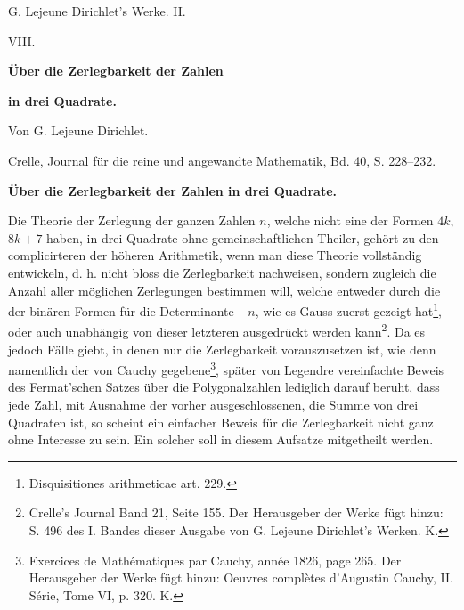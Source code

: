 \documentclass[11pt]{article}
\begin{document}
\begin{center}
{\Large G. Lejeune Dirichlet's Werke. II.}\par\vspace{1.2em}
{\Large VIII.}\par\vspace{0.5em}
{\LARGE \textbf{Über die Zerlegbarkeit der Zahlen}}\par
{\LARGE \textbf{in drei Quadrate.}}\par\vspace{1em}
{\large Von G. Lejeune Dirichlet.}\par\vspace{0.5em}
{\small Crelle, Journal für die reine und angewandte Mathematik, Bd. 40, S. 228--232.}
\end{center}

\begin{center}
{\large \textbf{Über die Zerlegbarkeit der Zahlen in drei Quadrate.}}
\end{center}

Die Theorie der Zerlegung der ganzen Zahlen $n$, welche nicht eine der Formen $4k$, $8k+7$ haben, in drei Quadrate ohne gemeinschaftlichen Theiler, gehört zu den complicirteren der höheren Arithmetik, wenn man diese Theorie vollständig entwickeln, d. h. nicht bloss die Zerlegbarkeit nachweisen, sondern zugleich die Anzahl aller möglichen Zerlegungen bestimmen will, welche entweder durch die der binären Formen für die Determinante $-n$, wie es Gauss zuerst gezeigt hat\footnote{Disquisitiones arithmeticae art. 229.}, oder auch unabhängig von dieser letzteren ausgedrückt werden kann\footnote{Crelle's Journal Band 21, Seite 155. Der Herausgeber der Werke fügt hinzu: S. 496 des I. Bandes dieser Ausgabe von G. Lejeune Dirichlet's Werken. K.}. Da es jedoch Fälle giebt, in denen nur die Zerlegbarkeit vorauszusetzen ist, wie denn namentlich der von Cauchy gegebene\footnote{Exercices de Mathématiques par Cauchy, année 1826, page 265. Der Herausgeber der Werke fügt hinzu: Oeuvres complètes d'Augustin Cauchy, II. Série, Tome VI, p. 320. K.}, später von Legendre vereinfachte Beweis des Fermat'schen Satzes über die Polygonalzahlen lediglich darauf beruht, dass jede Zahl, mit Ausnahme der vorher ausgeschlossenen, die Summe von drei Quadraten ist, so scheint ein einfacher Beweis für die Zerlegbarkeit nicht ganz ohne Interesse zu sein. Ein solcher soll in diesem Aufsatze mitgetheilt werden.
\end{document}
